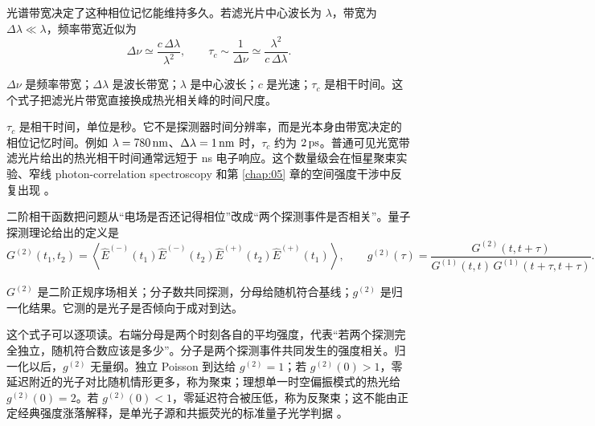 光谱带宽决定了这种相位记忆能维持多久。若滤光片中心波长为 \(\lambda\)，带宽为 \(\Delta\lambda\ll\lambda\)，频率带宽近似为
\begin{equation}
  \Delta\nu \simeq \frac{c\,\Delta\lambda}{\lambda^2},
  \qquad
  \tau_c \sim \frac{1}{\Delta\nu}
  \simeq \frac{\lambda^2}{c\,\Delta\lambda}.
  \label{eq:ch04-coherence-time}
\end{equation}
\begin{formulaexplain}
\(\Delta\nu\) 是频率带宽；\(\Delta\lambda\) 是波长带宽；\(\lambda\) 是中心波长；\(c\) 是光速；\(\tau_c\) 是相干时间。这个式子把滤光片带宽直接换成热光相关峰的时间尺度。
\end{formulaexplain}
\(\tau_c\) 是相干时间，单位是秒。它不是探测器时间分辨率，而是光本身由带宽决定的相位记忆时间。例如 \(\lambda=780\,{\rm nm}\)、\(\Delta\lambda=1\,{\rm nm}\) 时，\(\tau_c\) 约为 \(2\,{\rm ps}\)。普通可见光宽带滤光片给出的热光相干时间通常远短于 ns 电子响应。这个数量级会在恒星聚束实验、窄线 photon-correlation spectroscopy 和第 \ref{chap:05} 章的空间强度干涉中反复出现 \citep{2008AIPC..984..216D,2009A&A...507.1719F,2017MNRAS.472.4126G}。

二阶相干函数把问题从“电场是否还记得相位”改成“两个探测事件是否相关”。量子探测理论给出的定义是
\begin{equation}
  G^{(2)}(t_1,t_2)
  =
  \left\langle
    \hat E^{(-)}(t_1)\hat E^{(-)}(t_2)
    \hat E^{(+)}(t_2)\hat E^{(+)}(t_1)
  \right\rangle,
  \qquad
  g^{(2)}(\tau)=
  \frac{G^{(2)}(t,t+\tau)}
  {G^{(1)}(t,t)\,G^{(1)}(t+\tau,t+\tau)} .
  \label{eq:ch04-g2}
\end{equation}
\begin{formulaexplain}
\(G^{(2)}\) 是二阶正规序场相关；分子数共同探测，分母给随机符合基线；\(g^{(2)}\) 是归一化结果。它测的是光子是否倾向于成对到达。
\end{formulaexplain}
这个式子可以逐项读。右端分母是两个时刻各自的平均强度，代表“若两个探测完全独立，随机符合数应该是多少”。分子是两个探测事件共同发生的强度相关。归一化以后，\(g^{(2)}\) 无量纲。独立 Poisson 到达给 \(g^{(2)}=1\)；若 \(g^{(2)}(0)>1\)，零延迟附近的光子对比随机情形更多，称为聚束；理想单一时空偏振模式的热光给 \(g^{(2)}(0)=2\)。若 \(g^{(2)}(0)<1\)，零延迟符合被压低，称为反聚束；这不能由正定经典强度涨落解释，是单光子源和共振荧光的标准量子光学判据 \citep{1977PhRvL..39..691K,1979OptL....4..205M,1986PhRvA..33.4033Y,1993PhRvL..71.4287Z,2005Natur.436...87B}。

